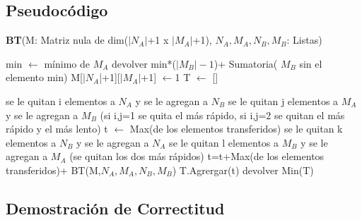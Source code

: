 \documentclass[spanish,12pt]{article}
\begin{document}
\subsection{Pseudocódigo}
\begin{algorithm}[H]{\textbf{BT}(M: Matriz nula de dim($|N_A|$+1 x $|M_A|$+1), $N_A, M_A, N_{B}, M_{B}$: Listas) }
	\begin{algorithmic}
			\State min $\gets$  mínimo de $M_A$
			\State devolver min*($|M_B|-1$)+ Sumatoria( $M_B$ sin el elemento min)
		\EndIf
		\State M[$|N_A$|+1][$|M_A|$+1] $\gets$1
		\State T $\gets$ []
		
					\State se le quitan i elementos a $N_A$ y se le agregan a $N_B$
					\State se le quitan j elementos a $M_A$ y se le agregan a $M_B$
					\State (si i,j=1 se quita el más rápido, si i,j=2 se quitan el más rápido y el más lento)
					\State t $\gets$ Max(de los elementos transferidos)
								\State se le quitan k elementos a $N_B$ y se le agregan a $N_A$
								\State se le quitan l elementos a $M_B$ y se le agregan a $M_A$
								\State (se quitan los dos más rápidos)
								\State t=t+Max(de los elementos transferidos)+ BT(M,$N_A,M_A,N_B,M_B$)
								\State T.Agrergar(t)
							\EndIf
						\EndWhile
					\EndWhile
				\EndIf
			\EndWhile
		\EndWhile
		\State devolver Min(T)

	\end{algorithmic}
\end{algorithm}


\subsection{Demostración de Correctitud}
\end{document}
